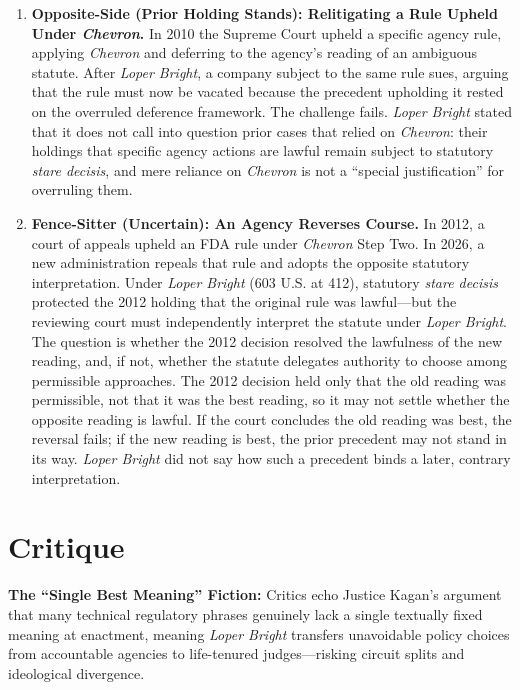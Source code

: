 \documentclass[12pt]{article}
\begin{document}
\begin{enumerate}
\item \textbf{Opposite-Side (Prior Holding Stands): Relitigating a Rule Upheld Under \textit{Chevron}.} In 2010 the Supreme Court upheld a specific agency rule, applying \textit{Chevron} and deferring to the agency's reading of an ambiguous statute. After \textit{Loper Bright}, a company subject to the same rule sues, arguing that the rule must now be vacated because the precedent upholding it rested on the overruled deference framework. The challenge fails. \textit{Loper Bright} stated that it does not call into question prior cases that relied on \textit{Chevron}: their holdings that specific agency actions are lawful remain subject to statutory \textit{stare decisis}, and mere reliance on \textit{Chevron} is not a ``special justification'' for overruling them.

\item \textbf{Fence-Sitter (Uncertain): An Agency Reverses Course.} In 2012, a court of appeals upheld an FDA rule under \textit{Chevron} Step Two. In 2026, a new administration repeals that rule and adopts the opposite statutory interpretation. Under \textit{Loper Bright} (603 U.S. at 412), statutory \textit{stare decisis} protected the 2012 holding that the original rule was lawful---but the reviewing court must independently interpret the statute under \textit{Loper Bright}. The question is whether the 2012 decision resolved the lawfulness of the new reading, and, if not, whether the statute delegates authority to choose among permissible approaches. The 2012 decision held only that the old reading was permissible, not that it was the best reading, so it may not settle whether the opposite reading is lawful. If the court concludes the old reading was best, the reversal fails; if the new reading is best, the prior precedent may not stand in its way. \textit{Loper Bright} did not say how such a precedent binds a later, contrary interpretation.

\end{enumerate}

\section{Critique}
\textbf{The ``Single Best Meaning'' Fiction:} Critics echo Justice Kagan's argument that many technical regulatory phrases genuinely lack a single textually fixed meaning at enactment, meaning \textit{Loper Bright} transfers unavoidable policy choices from accountable agencies to life-tenured judges---risking circuit splits and ideological divergence.
\end{document}
